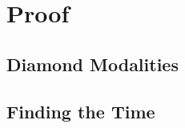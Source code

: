 
\section{Proof}

\subsection{Diamond Modalities}

\blindtext

\subsection{Finding the Time}

\blindtext

\blindtext